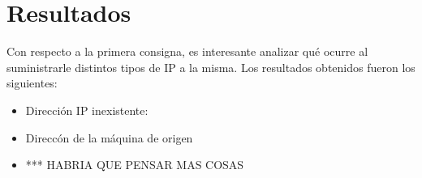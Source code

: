 \section{Resultados}

Con respecto a la primera consigna, es interesante analizar qu\'e ocurre al suministrarle distintos tipos de IP a la misma. Los resultados obtenidos fueron los siguientes:

\begin{itemize}
 \item Direcci\'on IP inexistente:
 \item Direcc\'on de la m\'aquina de origen
 \item *** HABRIA QUE PENSAR MAS COSAS
\end{itemize}


